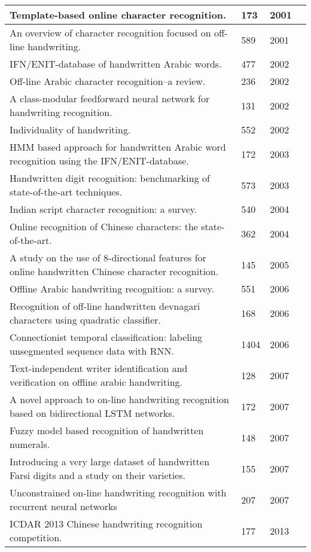 \documentclass{article}
\begin{document}
\begin{landscape}
\begin{longtable}{| p{16cm} | p{2cm}| p{1.5cm}| p{1cm}|}
Template-based online character recognition.   & 173 & 2001 & \cite{connell2001template}\\ \hline
An overview of character recognition focused on off-line handwriting. & 589 & 2001 & \cite{arica2001overview} \\ \hline
IFN/ENIT-database of handwritten Arabic words.& 477 & 2002 &\cite{pechwitz2002ifn}\\ \hline
Off-line Arabic character recognition–a review.& 236 & 2002 &\cite{khorsheed2002off}\\ \hline
A class-modular feedforward neural network for handwriting recognition. & 131 & 2002 &\cite{oh2002class}\\ \hline
Individuality of handwriting. & 552 & 2002 &\cite{srihari2002individuality}\\ \hline
HMM based approach for handwritten Arabic word recognition using the IFN/ENIT-database. & 172 & 2003 & \cite{pechwitz2003hmm}\\ \hline
Handwritten digit recognition: benchmarking of state-of-the-art techniques. & 573 & 2003 & \cite{liu2003handwritten}\\ \hline
Indian script character recognition: a survey. & 540 & 2004 & \cite{pal2004indian}\\ \hline
Online recognition of Chinese characters: the state-of-the-art. & 362 & 2004 &\cite{liu2004online}\\ \hline
A study on the use of 8-directional features for online handwritten Chinese character recognition. & 145 & 2005 & \cite{bai2005study}\\ \hline
Offline Arabic handwriting recognition: a survey. & 551 & 2006 & \cite{lorigo2006offline}\\ \hline
Recognition of off-line handwritten devnagari characters using quadratic classifier. & 168 & 2006 & \cite{sharma2006recognition}\\ \hline
Connectionist temporal classification: labeling unsegmented sequence data with RNN. & 1404 & 2006 & \cite{graves2006connectionist}\\ \hline
Text-independent writer identification and verification on offline arabic handwriting. & 128 & 2007 & \cite{bulacu2007text}\\ \hline
A novel approach to on-line handwriting recognition based on bidirectional LSTM networks. & 172 & 2007 & \cite{liwicki2007novel}\\ \hline
Fuzzy model based recognition of handwritten numerals. & 148 & 2007 & \cite{hanmandlu2007fuzzy}\\ \hline
Introducing a very large dataset of handwritten Farsi digits and a study on their varieties. & 155 & 2007 & \cite{khosravi2007introducing}\\ \hline
Unconstrained on-line handwriting recognition with recurrent neural networks & 207 & 2007 & \cite{graves2008unconstrained}\\ \hline
ICDAR 2013 Chinese handwriting recognition competition. & 177 & 2013 & \cite{yin2013icdar}\\ \hline



\end{longtable}
\end{landscape}
\end{document}
